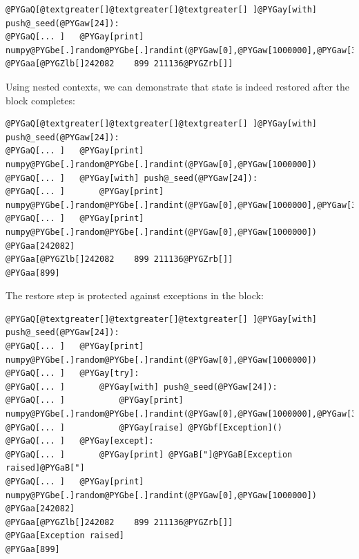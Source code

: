 \documentclass[letterpaper,10pt,english]{sphinxmanual}
\begin{document}
\begin{fulllineitems}
\begin{Verbatim}[commandchars=@\[\]]
@PYGaQ[@textgreater[]@textgreater[]@textgreater[] ]@PYGay[with] push@_seed(@PYGaw[24]):
@PYGaQ[... ]   @PYGay[print] numpy@PYGbe[.]random@PYGbe[.]randint(@PYGaw[0],@PYGaw[1000000],@PYGaw[3])
@PYGaa[@PYGZlb[]242082    899 211136@PYGZrb[]]
\end{Verbatim}

Using nested contexts, we can demonstrate that state is indeed
restored after the block completes:

\begin{Verbatim}[commandchars=@\[\]]
@PYGaQ[@textgreater[]@textgreater[]@textgreater[] ]@PYGay[with] push@_seed(@PYGaw[24]):
@PYGaQ[... ]   @PYGay[print] numpy@PYGbe[.]random@PYGbe[.]randint(@PYGaw[0],@PYGaw[1000000])
@PYGaQ[... ]   @PYGay[with] push@_seed(@PYGaw[24]):
@PYGaQ[... ]       @PYGay[print] numpy@PYGbe[.]random@PYGbe[.]randint(@PYGaw[0],@PYGaw[1000000],@PYGaw[3])
@PYGaQ[... ]   @PYGay[print] numpy@PYGbe[.]random@PYGbe[.]randint(@PYGaw[0],@PYGaw[1000000])
@PYGaa[242082]
@PYGaa[@PYGZlb[]242082    899 211136@PYGZrb[]]
@PYGaa[899]
\end{Verbatim}

The restore step is protected against exceptions in the block:

\begin{Verbatim}[commandchars=@\[\]]
@PYGaQ[@textgreater[]@textgreater[]@textgreater[] ]@PYGay[with] push@_seed(@PYGaw[24]):
@PYGaQ[... ]   @PYGay[print] numpy@PYGbe[.]random@PYGbe[.]randint(@PYGaw[0],@PYGaw[1000000])
@PYGaQ[... ]   @PYGay[try]:
@PYGaQ[... ]       @PYGay[with] push@_seed(@PYGaw[24]):
@PYGaQ[... ]           @PYGay[print] numpy@PYGbe[.]random@PYGbe[.]randint(@PYGaw[0],@PYGaw[1000000],@PYGaw[3])
@PYGaQ[... ]           @PYGay[raise] @PYGbf[Exception]()
@PYGaQ[... ]   @PYGay[except]:
@PYGaQ[... ]       @PYGay[print] @PYGaB["]@PYGaB[Exception raised]@PYGaB["]
@PYGaQ[... ]   @PYGay[print] numpy@PYGbe[.]random@PYGbe[.]randint(@PYGaw[0],@PYGaw[1000000])
@PYGaa[242082]
@PYGaa[@PYGZlb[]242082    899 211136@PYGZrb[]]
@PYGaa[Exception raised]
@PYGaa[899]
\end{Verbatim}

\end{fulllineitems}
\end{document}
